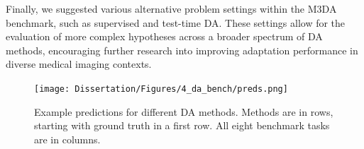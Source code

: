 Finally, we suggested various alternative problem settings within the M3DA benchmark, such as supervised and test-time DA. These settings allow for the evaluation of more complex hypotheses across a broader spectrum of DA methods, encouraging further research into improving adaptation performance in diverse medical imaging contexts.



\begin{figure}[h]
	\centering
	\texttt{[image: Dissertation/Figures/4\_da\_bench/preds.png]}
	\caption{Example predictions for different DA methods. Methods are in rows, starting with ground truth in a first row. All eight benchmark tasks are in columns.}
	\label{fig:predicts}
\end{figure}


